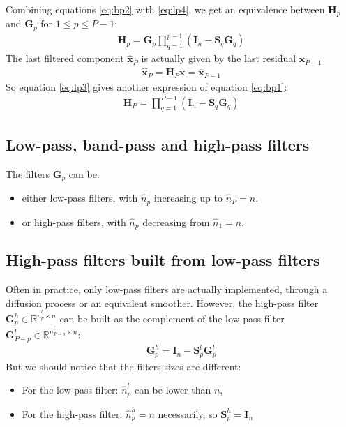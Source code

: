 \documentclass[12pt]{scrartcl}
\begin{document}
Combining equations \eqref{eq:bp2} with \eqref{eq:lp4}, we get an equivalence between $\mathbf{H}_p$ and $\mathbf{G}_p$ for $1 \le p \le P-1$:
\begin{align}
\label{eq:band_pass_filter}
\mathbf{H}_p = \mathbf{G}_p \prod_{q=1}^{p-1} \left(\mathbf{I}_n - \mathbf{S}_q \mathbf{G}_q\right)
\end{align}
The last filtered component $\widehat{\mathbf{x}}_P$ is actually given by the last residual $\overline{\mathbf{x}}_{P-1}$
\begin{align}
\widehat{\mathbf{x}}_P = \mathbf{H}_P \mathbf{x} = \overline{\mathbf{x}}_{P-1}
\end{align}
So equation \eqref{eq:lp3} gives another expression of equation \eqref{eq:bp1}:
\begin{align}
\mathbf{H}_P = \prod_{q=1}^{P-1} \left(\mathbf{I}_n - \mathbf{S}_q \mathbf{G}_q\right)
\end{align}

\subsection{Low-pass, band-pass and high-pass filters}
The filters $\mathbf{G}_p$ can be:
\begin{itemize}
\item either low-pass filters, with $\widehat{n}_p$ increasing up to $\widehat{n}_P = n$,
\item or high-pass filters, with $\widehat{n}_p$ decreasing from $\widehat{n}_1 = n$.
\end{itemize}

\subsection{High-pass filters built from low-pass filters}
Often in practice, only low-pass filters are actually implemented, through a diffusion process or an equivalent smoother. However, the high-pass filter $\mathbf{G}^h_p \in \mathbb{R}^{\widehat{n}^l_p \times n}$ can be built as the complement of the low-pass filter $\mathbf{G}^l_{P-p} \in \mathbb{R}^{\widehat{n}^l_{P-p} \times n}$:
\begin{align}
\mathbf{G}^h_p = \mathbf{I}_n - \mathbf{S}^l_p \mathbf{G}^l_p
\end{align}
But we should notice that the filters sizes are different:
\begin{itemize}
\item For the low-pass filter: $\widehat{n}^l_p$ can be lower than $n$,
\item For the high-pass filter: $\widehat{n}^h_p = n$ necessarily, so $\mathbf{S}^h_p = \mathbf{I}_n$
\end{itemize}
\end{document}
